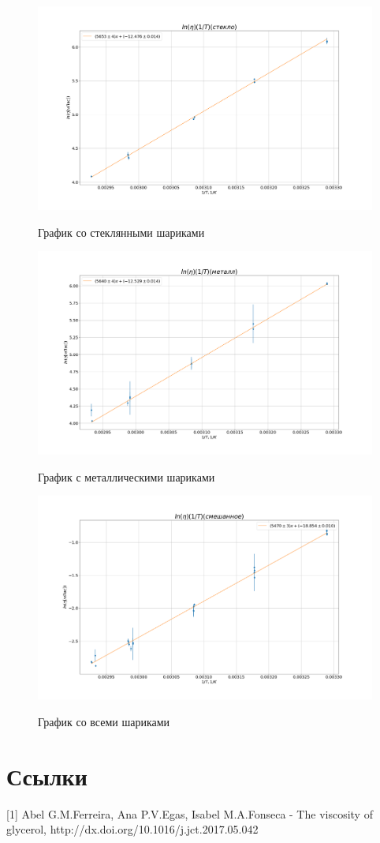 \documentclass[a4paper, 12pt]{article}
\begin{document}
    \begin{figure}
        \includegraphics[width=1.2\textwidth]{steklo}
        \label{plot_steklo}
        \caption{График со стеклянными шариками}
    \end{figure}


    \begin{figure}
        \includegraphics[width=1.2\textwidth]{metal}
        \label{plot_metal}
        \caption{График с металлическими шариками}
    \end{figure}


    \begin{figure}
        \includegraphics[width=1.2\textwidth]{mixed}
        \label{plot_mixed}
        \caption{График со всеми шариками}
    \end{figure}

    \section{Ссылки }
    [1] Abel G.M.Ferreira, Ana P.V.Egas, Isabel M.A.Fonseca - The viscosity of glycerol, http://dx.doi.org/10.1016/j.jct.2017.05.042
\end{document}

